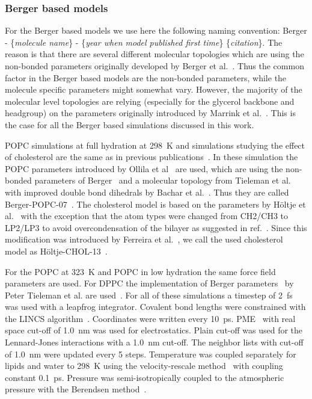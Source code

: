 \documentclass[journal=jacsat,manuscript=article]{achemso}
\begin{document}
\subsubsection{Berger based models}
For the Berger based models we use here the following naming convention: 
Berger - \{{\it molecule name}\} - \{{\it year when model published first time}\} \{{\it citation}\}.
The reason is that there are several different molecular topologies which are using the non-bonded parameters originally
developed by Berger et al.~\cite{berger97}. Thus the common factor in the Berger based models are the non-bonded parameters,
while the molecule specific parameters might somewhat vary. However, the majority of the molecular level topologies are 
relying (especially for the glycerol backbone and headgroup) on the parameters originally introduced by Marrink et al.~\cite{marrink98}.
This is the case for all the Berger based simulations discussed in this work.

POPC simulations at full hydration at 298~K and simulations studying the effect of cholesterol are the same as in previous publications~\cite{ferreira13,ferreira15}.
In these simulation the POPC parameters introduced by Ollila et al~\cite{ollila07a} are used, which are using the non-bonded parameters of Berger~\cite{berger97}
and a molecular topology from Tieleman et al.~\cite{tieleman99} with improved double bond dihedrals by Bachar et al.~\cite{bachar04}. 
Thus they are called Berger-POPC-07~\cite{ollila07a}. The cholesterol model is based on the parameters by H\"oltje et al.~\cite{holtje01} with the
exception that the atom types were changed from CH2/CH3 to LP2/LP3 to avoid overcondensation of the bilayer as suggested in ref.~\cite{tieleman06}.
Since this modification was introduced by Ferreira et al.~\cite{ferreira13}, we call the used cholesterol model as H\"oltje-CHOL-13~\cite{ferreira13}.

For the POPC at 323~K and POPC in low hydration the same force field parameters are used.
For DPPC the implementation of Berger parameters~\cite{berger97} by Peter Tieleman et al. are used~\cite{marrink98}.
For all of these simulations a timestep of 2~fs was used with a leapfrog integrator. Covalent bond lengths were constrained with the LINCS algorithm~\cite{hess97,hess07}. 
Coordinates were written every 10~ps. PME~\cite{darden93,essman95} with real space cut-off of 1.0~nm was used 
for electrostatics. Plain cut-off was used for the Lennard-Jones interactions with a 1.0~nm cut-off.
The neighbor lists with cut-off of 1.0~nm were updated every 5 steps. Temperature was coupled separately
for lipids and water to 298~K using the velocity-rescale method~\cite{bussi07} with coupling constant 0.1~ps.
Pressure was semi-isotropically coupled to the atmospheric pressure with the Berendsen method~\cite{berendsen84}.
\end{document}
